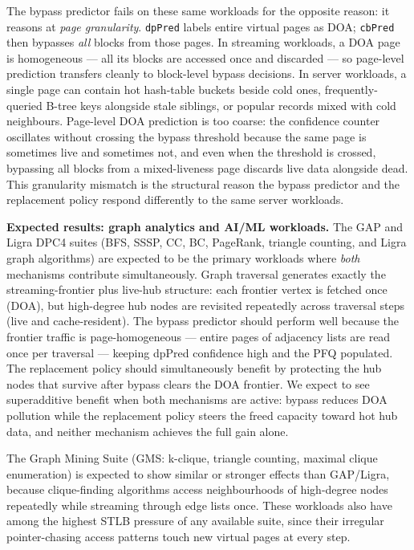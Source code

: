 \documentclass[12pt]{article}
\begin{document}
The bypass predictor fails on these same workloads for the opposite reason:
it reasons at \emph{page granularity}.
\texttt{dpPred} labels entire virtual pages as DOA; \texttt{cbPred} then
bypasses \emph{all} blocks from those pages.
In streaming workloads, a DOA page is homogeneous --- all its blocks are
accessed once and discarded --- so page-level prediction transfers cleanly
to block-level bypass decisions.
In server workloads, a single page can contain hot hash-table buckets beside
cold ones, frequently-queried B-tree keys alongside stale siblings, or popular
records mixed with cold neighbours.
Page-level DOA prediction is too coarse: the confidence counter oscillates
without crossing the bypass threshold because the same page is sometimes
live and sometimes not, and even when the threshold is crossed, bypassing all
blocks from a mixed-liveness page discards live data alongside dead.
This granularity mismatch is the structural reason the bypass predictor and
the replacement policy respond differently to the same server workloads.

\textbf{Expected results: graph analytics and AI/ML workloads.}
The GAP and Ligra DPC4 suites (BFS, SSSP, CC, BC, PageRank, triangle
counting, and Ligra graph algorithms) are expected to be the primary workloads
where \emph{both} mechanisms contribute simultaneously.
Graph traversal generates exactly the streaming-frontier plus live-hub structure:
each frontier vertex is fetched once (DOA), but high-degree hub nodes are
revisited repeatedly across traversal steps (live and cache-resident).
The bypass predictor should perform well because the frontier traffic is
page-homogeneous --- entire pages of adjacency lists are read once per
traversal --- keeping dpPred confidence high and the PFQ populated.
The replacement policy should simultaneously benefit by protecting the hub
nodes that survive after bypass clears the DOA frontier.
We expect to see superadditive benefit when both mechanisms are active:
bypass reduces DOA pollution while the replacement policy steers the freed
capacity toward hot hub data, and neither mechanism achieves the full gain alone.

The Graph Mining Suite (GMS: k-clique, triangle counting, maximal clique
enumeration) is expected to show similar or stronger effects than GAP/Ligra,
because clique-finding algorithms access neighbourhoods of high-degree nodes
repeatedly while streaming through edge lists once.
These workloads also have among the highest STLB pressure of any available
suite, since their irregular pointer-chasing access patterns touch new virtual
pages at every step.
\end{document}
